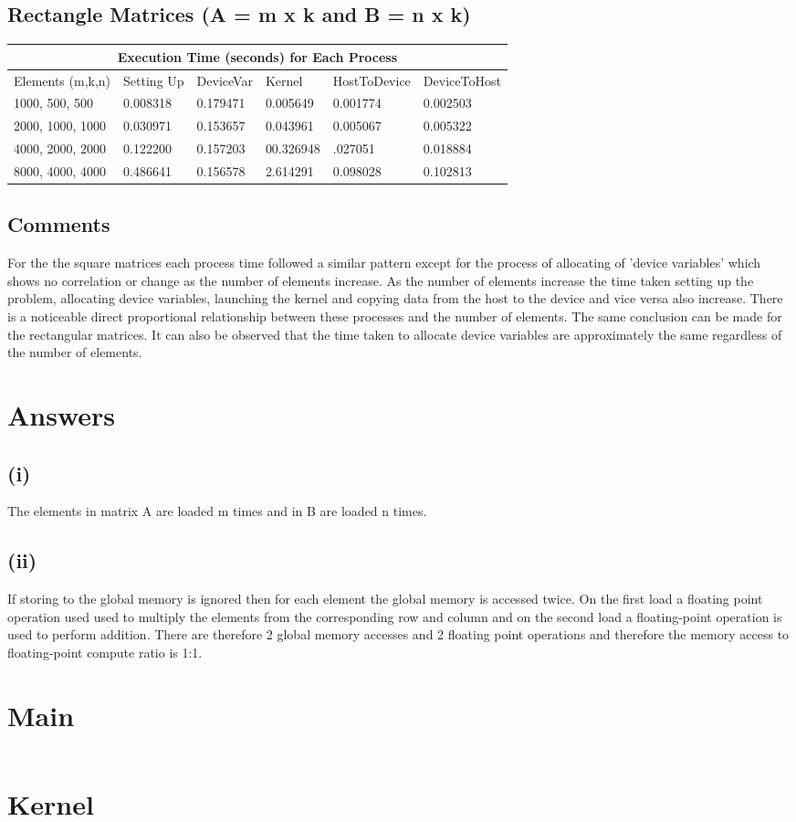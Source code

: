 \documentclass{article}
\begin{document}
  \subsection{Rectangle Matrices (A = m x k and B = n x k)} 
  \setlength{\parindent}{1cm}
  \begin{tabular}{ |p{2.5cm}||p{2cm}|p{2cm}|p{2cm}|p{2cm}|p{2cm}|  }
 \hline
 \multicolumn{6}{|c|}{Execution Time (seconds) for Each Process } \\
 \hline
 Elements (m,k,n) & Setting Up & DeviceVar & Kernel & HostToDevice & DeviceToHost\\
 \hline
 1000, 500, 500 & 0.008318 & 0.179471 & 0.005649 & 0.001774 & 0.002503\\
 \hline
 2000, 1000, 1000 & 0.030971 & 0.153657  & 0.043961 & 0.005067 & 0.005322\\
 \hline
 4000, 2000, 2000 & 0.122200 & 0.157203 & 00.326948 & .027051 & 0.018884\\
 \hline
 8000, 4000, 4000 & 0.486641  & 0.156578 & 2.614291 & 0.098028 & 0.102813 \\
  \hline
 \end{tabular}
 
 
 \subsection{Comments}
For the the square matrices each process time followed a similar pattern except for the process of allocating of 'device variables'  which shows no correlation or change as the number of elements increase. As the number of elements increase the time taken setting up the problem, allocating device variables, launching the kernel and copying data from the host to the device and vice versa also increase. There is a noticeable direct proportional relationship  between these processes and the number of elements. The same conclusion can be made for the rectangular matrices. It can also be observed that the time taken to allocate device variables are approximately the same regardless of the number of elements. 

\section{Answers}
\subsection{(i)}   
The elements in matrix A are loaded m times and in B are loaded n times.
\subsection{(ii)}
If storing to the global memory is ignored then for each element the global memory is accessed twice. On the first load a floating point operation used used to multiply the elements from the corresponding row and column and on the second load a floating-point operation is used to perform addition. There are therefore 2 global memory accesses and 2 floating point operations and therefore the memory access to floating-point compute ratio is 1:1.
\section{Main}
\inputminted[breaklines, linenos]{c}{./main.cu}

\section{Kernel}
\inputminted[breaklines, linenos]{c}{./kernel.cu}
\end{document}
